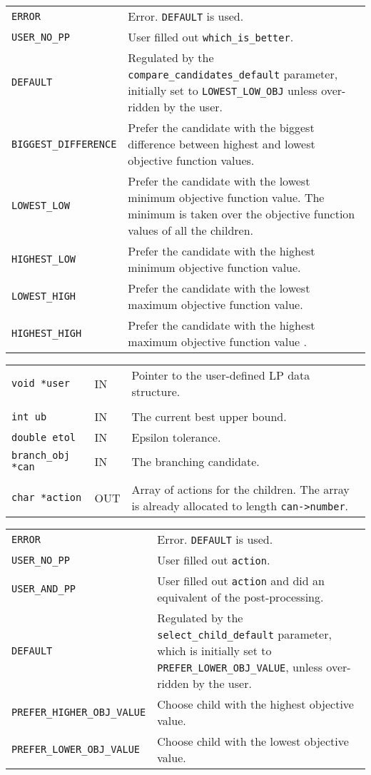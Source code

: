 \documentclass[twoside,11pt]{article}
\begin{document}
{\newpage
\clearpage
\samepage \begin{tabular}{lp{327.725pt}}
{\tt ERROR} & Error. {\tt DEFAULT} is used. \\ 
{\tt USER\_NO\_PP} & User filled out {\tt *which\_is\_better}. \\ 
{\tt DEFAULT} & Regulated by the {\tt compare\_candidates\_default}
parameter, initially set to {\tt LOWEST\_LOW\_OBJ} unless over-ridden by the
user. \\ 
{\tt BIGGEST\_DIFFERENCE} & Prefer the candidate with the biggest
difference between highest and lowest objective function values.\\ 
{\tt LOWEST\_LOW} & Prefer the candidate with the lowest minimum
objective function value. The minimum is taken over the objective function
values of all the children. \\ 
{\tt HIGHEST\_LOW} & Prefer the candidate with the highest minimum
objective function value. \\ 
{\tt LOWEST\_HIGH} & Prefer the candidate with the lowest maximum
objective function value. \\ 
{\tt HIGHEST\_HIGH} & Prefer the candidate with the highest maximum
objective function value .\\ 
\end{tabular}
}

{\newpage
\clearpage
\samepage \begin{tabular}{llp{297.864pt}}
{\tt void *user} &  IN & Pointer to the user-defined LP data structure. \\ 
& & \\ 
{\tt int ub} & IN & The current best upper bound. \\ 
{\tt double etol} & IN & Epsilon tolerance. \\ 
{\tt branch\_obj *can} & IN & The branching candidate. \\ 
& & \\ 
{\tt char *action} & OUT & Array of actions for the children. The array is
already allocated to length {\tt can->number}.\\ 
\end{tabular}
}

{\newpage
\clearpage
\samepage \begin{tabular}{lp{304.416pt}}
{\tt ERROR} & Error. {\tt DEFAULT} is used. \\ 
{\tt USER\_NO\_PP} & User filled out {\tt *action}. \\ 
{\tt USER\_AND\_PP} & User filled out {\tt *action} and did an
equivalent of the post-processing.\\ 
{\tt DEFAULT} & Regulated by the {\tt select\_child\_default}
parameter, which is initially set to {\tt PREFER\_LOWER\_OBJ\_VALUE},
unless over-ridden by the user. \\ 
{\tt PREFER\_HIGHER\_OBJ\_VALUE} & Choose child with the highest
objective value.\\ 
{\tt PREFER\_LOWER\_OBJ\_VALUE} & Choose child with the lowest
objective value.\\ 
\end{tabular}
}
\end{document}
